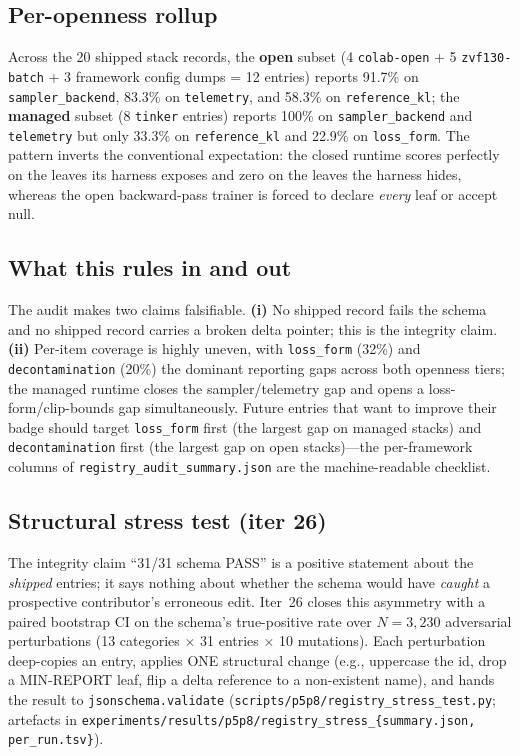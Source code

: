 \subsection{Per-openness rollup}
Across the 20 shipped stack records, the \textbf{open} subset (4
\texttt{colab-open} + 5 \texttt{zvf130-batch} + 3 framework config
dumps = 12 entries) reports 91.7\% on \texttt{sampler\_backend}, 83.3\%
on \texttt{telemetry}, and 58.3\% on \texttt{reference\_kl}; the
\textbf{managed} subset (8 \texttt{tinker} entries) reports 100\% on
\texttt{sampler\_backend} and \texttt{telemetry} but only 33.3\% on
\texttt{reference\_kl} and 22.9\% on \texttt{loss\_form}. The pattern
inverts the conventional expectation: the closed runtime scores
perfectly on the leaves its harness exposes and zero on the leaves the
harness hides, whereas the open backward-pass trainer is forced to
declare \emph{every} leaf or accept null.

\subsection{What this rules in and out}
The audit makes two claims falsifiable. \textbf{(i)} No shipped record
fails the schema and no shipped record carries a broken delta pointer;
this is the integrity claim. \textbf{(ii)} Per-item coverage is highly
uneven, with \texttt{loss\_form} (32\%) and \texttt{decontamination}
(20\%) the dominant reporting gaps across both openness tiers; the
managed runtime closes the sampler/telemetry gap and opens a
loss-form/clip-bounds gap simultaneously. Future entries that want to
improve their badge should target \texttt{loss\_form} first
(the largest gap on managed stacks) and \texttt{decontamination} first
(the largest gap on open stacks)---the per-framework columns of
\texttt{registry\_audit\_summary.json} are the machine-readable
checklist.

\subsection{Structural stress test (iter 26)}
\label{sec:p6-stress}

The integrity claim ``31/31 schema PASS'' is a positive statement
about the \emph{shipped} entries; it says nothing about whether the
schema would have \emph{caught} a prospective contributor's erroneous
edit. Iter~26 closes this asymmetry with a paired bootstrap CI on the
schema's true-positive rate over $N = 3{,}230$ adversarial
perturbations (13 categories $\times$ 31 entries $\times$ 10
mutations). Each perturbation deep-copies an entry, applies ONE
structural change (e.g., uppercase the id, drop a MIN-REPORT leaf,
flip a delta reference to a non-existent name), and hands the result to
\texttt{jsonschema.validate} (\texttt{scripts/p5p8/registry\_stress\_test.py};
artefacts in
\texttt{experiments/results/p5p8/registry\_stress\_\{summary.json, per\_run.tsv\}}).

